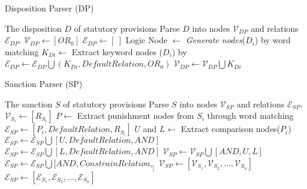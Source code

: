 \begin{algorithm}
\small
\caption{Disposition Parser (DP)}
\label{alg:DP}
\begin{algorithmic}[1]
\Require The disposition \( D \) of statutory provisions
\Ensure Parse \( D \) into nodes $\mathcal{V}_{DP}$ and relations $\mathcal{E}_{DP}$.
\State $\mathcal{V}_{DP} \gets [{OR}_0] $ 
\State $\mathcal{E}_{DP} \gets [ \ ] $
 
    \State Logic Node $\gets$ \textit{Generate nodes}(\( D_i \)) by word matching
\State $K_{Di} \gets$ Extract keyword nodes (\( D_i \)) by 
\State $\mathcal{E}_{DP} \gets \mathcal{E}_{DP} \bigcup (K_{Di}, DefaultRelation, {OR}_0)$
\State $\mathcal{V}_{DP} \gets \mathcal{V}_{DP} \bigcup K_{Di}$
\EndFor
\end{algorithmic}
\end{algorithm}


\begin{algorithm}
\small
\caption{Sanction Parser (SP)}
\label{alg:SP}
\begin{algorithmic}[1]
\Require The sanction \( S \) of statutory provisions
\Ensure Parse \( S \) into nodes $\mathcal{V}_{SP}$ and relations $\mathcal{E}_{SP}$.
 
\State $\mathcal{V}_{S_i} \gets [R_{S_i}]$ 
\State $P \gets $ Extract punishment nodes from \( S_i \) through word matching
\State $\mathcal{E}_{SP} \gets [P_i, DefaultRelation, R_{S_i}]$ 
\State  $U$ and $L \gets $ Extract comparison nodes($P_i$) 
\State $\mathcal{E}_{SP} \gets \mathcal{E}_{SP} \bigcup [U, DefaultRelation, AND]$
\State $\mathcal{E}_{SP} \gets \mathcal{E}_{SP} \bigcup  [L, DefaultRelation, AND]$ 
\State $\mathcal{V}_{SP} \gets \mathcal{V}_{SP} \bigcup [AND, U, L]$ 
\State $\mathcal{E}_{SP} \gets \mathcal{E}_{SP} \bigcup  [AND, ConstrainRelation, _]$ 
\EndFor
\State $\mathcal{V}_{SP} \gets [\mathcal{V}_{S_1},\mathcal{V}_{S_2},...,\mathcal{V}_{S_n}]$
\State $\mathcal{E}_{SP} \gets [\mathcal{E}_{S_1},\mathcal{E}_{S_2},...,\mathcal{E}_{S_n}]$
\end{algorithmic}
\end{algorithm}